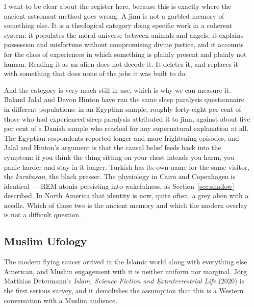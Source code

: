 
I want to be clear about the register here, because this is exactly where the ancient astronaut
method goes wrong. A jinn is not a garbled memory of something else. It is a theological category
doing specific work in a coherent system: it populates the moral universe between animals and
angels, it explains possession and misfortune without compromising divine justice, and it accounts
for the class of experiences in which something is plainly present and plainly not human. Reading
it as an alien does not decode it. It deletes it, and replaces it with something that does none of
the jobs it was built to do.

And the category is very much still in use, which is why we can measure it. Baland Jalal and
Devon Hinton have run the same sleep paralysis questionnaire in different populations: in an
Egyptian sample, roughly forty-eight per cent of those who had experienced sleep paralysis
attributed it to jinn, against about five per cent of a Danish sample who reached for any
supernatural explanation at all. The Egyptian respondents reported longer and more frightening
episodes, and Jalal and Hinton's argument is that the causal belief feeds back into the symptom:
if you think the thing sitting on your chest intends you harm, you panic harder and stay in it
longer. Turkish has its own name for the same visitor, the \emph{karabasan}, the black presser.
The physiology in Cairo and Copenhagen is identical --- REM atonia persisting into wakefulness,
as Section~\ref{sec:shadow} described.  In North America that identity is now, quite
often, a grey alien with a needle. Which of those two is the ancient memory and which the modern
overlay is not a difficult question.

\subsection{Muslim Ufology}

The modern flying saucer arrived in the Islamic world along with everything else American, and
Muslim engagement with it is neither uniform nor marginal. Jörg Matthias Determann's
\emph{Islam, Science Fiction and Extraterrestrial Life} (2020) is the first serious survey, and it
demolishes the assumption that this is a Western conversation with a Muslim audience.

